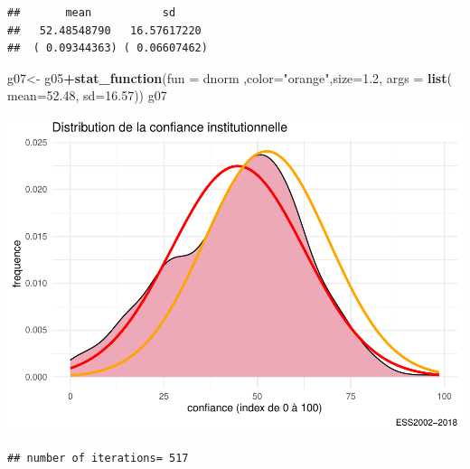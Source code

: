\documentclass[
]{book}
\newenvironment{Shaded}{\begin{snugshade}}{\end{snugshade}}
\newcommand{\DataTypeTok}[1]{\textcolor[rgb]{0.13,0.29,0.53}{#1}}
\newcommand{\DecValTok}[1]{\textcolor[rgb]{0.00,0.00,0.81}{#1}}
\newcommand{\FloatTok}[1]{\textcolor[rgb]{0.00,0.00,0.81}{#1}}
\newcommand{\KeywordTok}[1]{\textcolor[rgb]{0.13,0.29,0.53}{\textbf{#1}}}
\newcommand{\NormalTok}[1]{#1}
\newcommand{\OperatorTok}[1]{\textcolor[rgb]{0.81,0.36,0.00}{\textbf{#1}}}
\newcommand{\StringTok}[1]{\textcolor[rgb]{0.31,0.60,0.02}{#1}}
\begin{document}
\begin{verbatim}
##       mean           sd     
##   52.48548790   16.57617220 
##  ( 0.09344363) ( 0.06607462)
\end{verbatim}

\begin{Shaded}
\begin{Highlighting}[]
\NormalTok{g07<-}\StringTok{ }\NormalTok{g05}\OperatorTok{+}\KeywordTok{stat_function}\NormalTok{(}\DataTypeTok{fun =}\NormalTok{  dnorm ,}\DataTypeTok{color=}\StringTok{"orange"}\NormalTok{,}\DataTypeTok{size=}\FloatTok{1.2}\NormalTok{, }\DataTypeTok{args =} \KeywordTok{list}\NormalTok{( }\DataTypeTok{mean=}\FloatTok{52.48}\NormalTok{,  }\DataTypeTok{sd=}\FloatTok{16.57}\NormalTok{))}
\NormalTok{g07}
\end{Highlighting}
\end{Shaded}

\includegraphics{bookdown-demo_files/figure-latex/307-1.pdf}

\begin{Shaded}
\end{Shaded}

\begin{verbatim}
## number of iterations= 517
\end{verbatim}

\begin{Shaded}
\end{Shaded}
\end{document}
